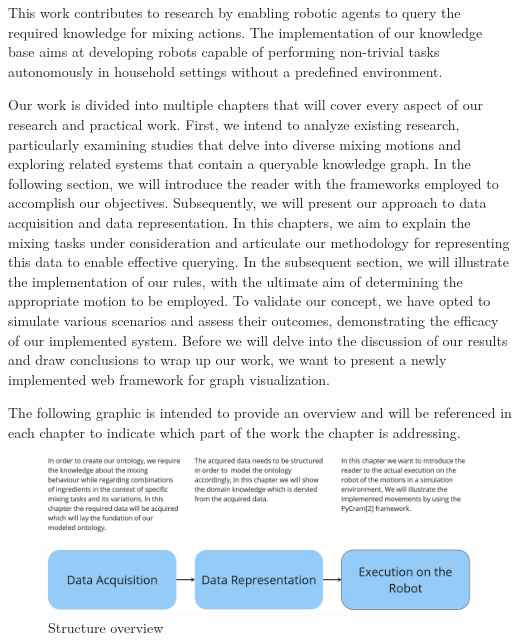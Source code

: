 This work contributes to research by enabling robotic agents to query the required knowledge for mixing actions. The implementation of our knowledge base aims at developing robots capable of performing non-trivial tasks autonomously in household settings without a predefined environment.


Our work is divided into multiple chapters that will cover every aspect of our research and practical work.
First, we intend to analyze existing research, particularly examining studies that delve into diverse mixing motions and exploring related systems that contain a queryable knowledge graph.
In the following section, we will introduce the reader with the frameworks employed to accomplish our objectives.	
Subsequently, we will present our approach to data acquisition and data representation.
In this chapters, we aim to explain the mixing tasks under consideration and articulate our methodology for representing this data to enable effective querying.
In the subsequent section, we will illustrate the implementation of our rules, with the ultimate aim of determining the appropriate motion to be employed.
To validate our concept, we have opted to simulate various scenarios and assess their outcomes, demonstrating the efficacy of our implemented system.
Before we will delve into the discussion of our results and draw conclusions to wrap up our work, we want to present a newly implemented web framework for graph visualization.

The following graphic is intended to provide an overview and will be referenced in each chapter to indicate which part of the work the chapter is addressing.
\begin{figure}[H]
    \includegraphics[scale=0.25]{Graphics/structure_overview.jpg}
    \caption{Structure overview}
\end{figure}